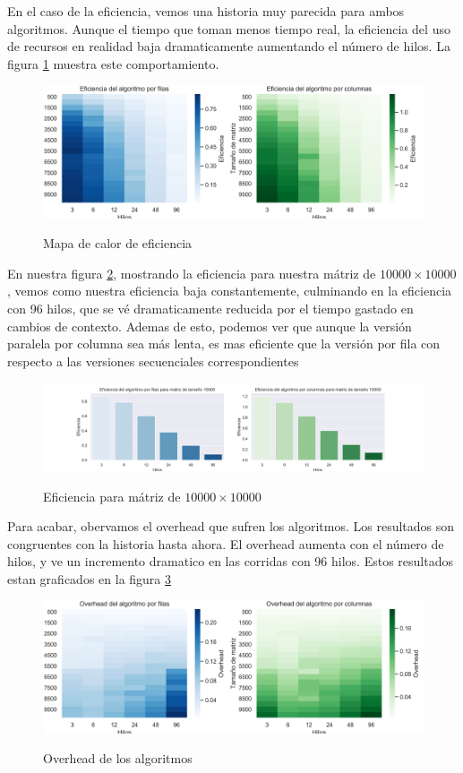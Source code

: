 \documentclass{report}
\begin{document}
En el caso de la eficiencia, vemos una historia muy parecida para ambos algoritmos.
Aunque el tiempo que toman menos tiempo real, la eficiencia del uso de recursos
en realidad baja dramaticamente aumentando el número de hilos. La figura
\ref{fig:stareff} muestra este comportamiento.

\begin{figure}[H]
    \centering
  \caption{Mapa de calor de eficiencia}
\includegraphics[width=\textwidth]{stars_eff}
\label{fig:stareff}
\end{figure}

En nuestra figura \ref{fig:stareffbar}, mostrando la eficiencia para nuestra mátriz
de $10000 \times 10000$, vemos como nuestra eficiencia baja constantemente,
culminando en la eficiencia con 96 hilos, que se vé dramaticamente reducida por el
tiempo gastado en cambios de contexto. Ademas de esto, podemos ver que aunque la
versión paralela por columna sea más lenta, es mas eficiente que la versión por
fila con respecto a las versiones secuenciales correspondientes

\begin{figure}[H]
    \centering
  \caption{Eficiencia para mátriz de $10000 \times 10000$}
  \includegraphics[width=\textwidth]{stars_eff_bar}
\label{fig:stareffbar}
\end{figure}

Para acabar, obervamos el overhead que sufren los algoritmos. Los resultados
son congruentes con la historia hasta ahora. El overhead aumenta con el número de
hilos, y ve un incremento dramatico en las corridas con 96 hilos. Estos resultados
estan graficados en la figura \ref{fig:staroverhead}

\begin{figure}[H]
    \centering
  \caption{Overhead de los algoritmos}
\includegraphics[width=\textwidth]{stars_overhead}
\label{fig:staroverhead}
\end{figure}
\end{document}
